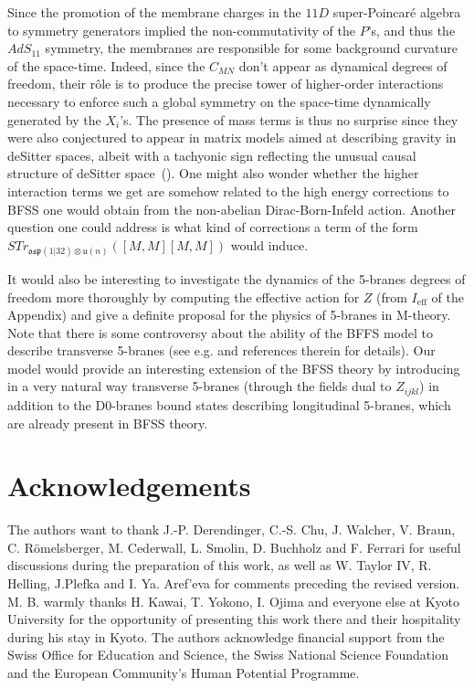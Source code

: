\documentclass[a4paper,11pt]{article}
\begin{document}
Since the promotion of the membrane charges in the $11D$ super-Poincar\'e algebra to symmetry generators
implied the non-commutativity of the $P$'s, and thus the $AdS_{11}$ symmetry, the membranes are responsible for
some background curvature of the space-time. Indeed, since the $C_{MN}$ don't appear as dynamical degrees of freedom, 
their r\^ole is to produce the precise tower of higher-order interactions necessary to enforce such a global symmetry
on the space-time dynamically generated by the $X_i$'s.
The presence of mass terms is thus no surprise since they were also conjectured to appear in matrix models aimed 
at describing gravity in deSitter spaces, albeit with a tachyonic sign reflecting the unusual causal structure of 
deSitter space~(\cite{Gao,Cham}).
One might also wonder whether the higher interaction terms we get are somehow related to the high energy corrections 
to BFSS one would obtain from the non-abelian Dirac-Born-Infeld action. Another question one could address is 
what kind of corrections a term of the form $STr_{\mathfrak{osp}(1|32)\otimes \mathfrak{u}(n)} ([M,M][M,M])$ would 
induce.

It would also be interesting to investigate the dynamics of the 5-branes degrees of freedom more thoroughly by computing
the effective action for $Z$ (from $I_{\text{eff}}$ of the Appendix) and give a definite proposal for the physics of 
5-branes in M-theory. Note that there is some controversy about the ability of the BFFS model to describe transverse 
5-branes (see e.g. \cite{GRWati,BSS} and references therein for details). Our model would provide an interesting 
extension of the BFSS theory by introducing in a very natural way transverse 5-branes (through the fields dual to 
$Z_{ijkl}$) in addition to the D0-branes bound states describing longitudinal 5-branes, which are already present 
in BFSS theory. 

\section{Acknowledgements}
The authors want to thank J.-P. Derendinger, C.-S. Chu, J. Walcher, V. Braun, C. R\"omelsberger, M. Cederwall, 
L. Smolin, D. Buchholz and F. Ferrari for useful discussions during the preparation of this work, as well as
W. Taylor IV, R. Helling, J.Plefka and I. Ya. Aref'eva for comments preceding the revised version. M. B. warmly 
thanks H. Kawai, T. Yokono, I. Ojima and everyone else at Kyoto University for the opportunity of presenting 
this work there and their hospitality during his stay in Kyoto. The authors acknowledge financial support from the Swiss Office 
for Education and Science, the Swiss National Science Foundation and the European Community's Human Potential
Programme.
\end{document}
